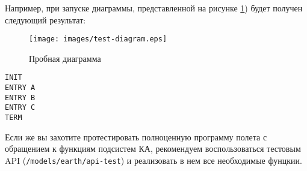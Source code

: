 \documentclass[12pt,a4paper]{article}
\begin{document}
Например, при запуске диаграммы, представленной на рисунке \ref{Pic:TestDiagr}) будет получен следующий результат:

\begin{figure}[tbh]
  \begin{center}
    \texttt{[image: images/test-diagram.eps]}
    \caption{Пробная диаграмма}
    \label{Pic:TestDiagr}
  \end{center}
\end{figure}

\begin{verbatim}
INIT
ENTRY A
ENTRY B
ENTRY C
TERM
\end{verbatim}

Если же вы захотите протестировать полноценную программу полета с обращением к функциям
подсистем КА, рекомендуем воспользоваться тестовым API (\verb'/models/earth/api-test') и
реализовать в нем все необходимые фунцкии.
\end{document}
